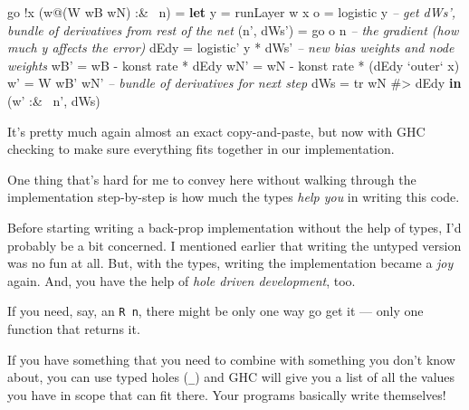 \documentclass[]{article}
\newenvironment{Shaded}{}{}
\newcommand{\KeywordTok}[1]{\textcolor[rgb]{0.00,0.44,0.13}{\textbf{{#1}}}}
\newcommand{\DataTypeTok}[1]{\textcolor[rgb]{0.56,0.13,0.00}{{#1}}}
\newcommand{\CommentTok}[1]{\textcolor[rgb]{0.38,0.63,0.69}{\textit{{#1}}}}
\newcommand{\OtherTok}[1]{\textcolor[rgb]{0.00,0.44,0.13}{{#1}}}
\newcommand{\FunctionTok}[1]{\textcolor[rgb]{0.02,0.16,0.49}{{#1}}}
\newcommand{\NormalTok}[1]{{#1}}
\begin{document}
\begin{Shaded}
\begin{Highlighting}[]
    \NormalTok{go }\FunctionTok{!}\NormalTok{x (w}\FunctionTok{@}\NormalTok{(}\DataTypeTok{W} \NormalTok{wB wN) }\FunctionTok{:&~} \NormalTok{n)}
        \FunctionTok{=} \KeywordTok{let} \NormalTok{y          }\FunctionTok{=} \NormalTok{runLayer w x}
              \NormalTok{o          }\FunctionTok{=} \NormalTok{logistic y}
              \CommentTok{-- get dWs', bundle of derivatives from rest of the net}
              \NormalTok{(n', dWs') }\FunctionTok{=} \NormalTok{go o n}
              \CommentTok{-- the gradient (how much y affects the error)}
              \NormalTok{dEdy       }\FunctionTok{=} \NormalTok{logistic' y }\FunctionTok{*} \NormalTok{dWs'}
              \CommentTok{-- new bias weights and node weights}
              \NormalTok{wB'  }\FunctionTok{=} \NormalTok{wB }\FunctionTok{-} \NormalTok{konst rate }\FunctionTok{*} \NormalTok{dEdy}
              \NormalTok{wN'  }\FunctionTok{=} \NormalTok{wN }\FunctionTok{-} \NormalTok{konst rate }\FunctionTok{*} \NormalTok{(dEdy }\OtherTok{`outer`} \NormalTok{x)}
              \NormalTok{w'   }\FunctionTok{=} \DataTypeTok{W} \NormalTok{wB' wN'}
              \CommentTok{-- bundle of derivatives for next step}
              \NormalTok{dWs  }\FunctionTok{=} \NormalTok{tr wN }\FunctionTok{#>} \NormalTok{dEdy}
          \KeywordTok{in}  \NormalTok{(w' }\FunctionTok{:&~} \NormalTok{n', dWs)}
\end{Highlighting}
\end{Shaded}

It's pretty much again almost an exact copy-and-paste, but now with GHC
checking to make sure everything fits together in our implementation.

One thing that's hard for me to convey here without walking through the
implementation step-by-step is how much the types \emph{help you} in
writing this code.

Before starting writing a back-prop implementation without the help of
types, I'd probably be a bit concerned. I mentioned earlier that writing
the untyped version was no fun at all. But, with the types, writing the
implementation became a \emph{joy} again. And, you have the help of
\emph{hole driven development}, too.

If you need, say, an \texttt{R\ n}, there might be only one way go get
it --- only one function that returns it.

If you have something that you need to combine with something you don't
know about, you can use typed holes (\texttt{\_}) and GHC will give you
a list of all the values you have in scope that can fit there. Your
programs basically write themselves!
\end{document}
